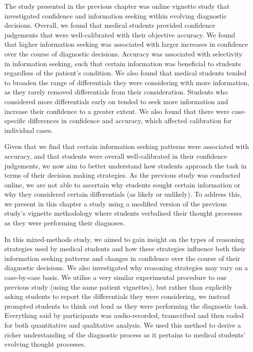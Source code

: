 \documentclass[a4paper, nobind]{templates/ociamthesis}
\begin{document}
The study presented in the previous chapter was online vignette study that investigated confidence and information seeking within evolving diagnostic decisions. Overall, we found that medical students provided confidence judgements that were well-calibrated with their objective accuracy. We found that higher information seeking was associated with larger increases in confidence over the course of diagnostic decisions. Accuracy was associated with selectivity in information seeking, such that certain information was beneficial to students regardless of the patient's condition. We also found that medical students tended to broaden the range of differentials they were considering with more information, as they rarely removed differentials from their consideration. Students who considered more differentials early on tended to seek more information and increase their confidence to a greater extent. We also found that there were case-specific differences in confidence and accuracy, which affected calibration for individual cases.

\hfill\break
Given that we find that certain information seeking patterns were associated with accuracy, and that students were overall well-calibrated in their confidence judgements, we now aim to better understand how students approach the task in terms of their decision making strategies. As the previous study was conducted online, we are not able to ascertain why students sought certain information or why they considered certain differentials (as likely or unlikely). To address this, we present in this chapter a study using a modified version of the previous study's vignette methodology where students verbalised their thought processes as they were performing their diagnoses.

\hfill\break
In this mixed-methods study, we aimed to gain insight on the types of reasoning strategies used by medical students and how these strategies influence both their information seeking patterns and changes in confidence over the course of their diagnostic decisions. We also investigated why reasoning strategies may vary on a case-by-case basis. We utilise a very similar experimental procedure to our previous study (using the same patient vignettes), but rather than explicitly asking students to report the differentials they were considering, we instead prompted students to think out loud as they were performing the diagnostic task. Everything said by participants was audio-recorded, transcribed and then coded for both quantitative and qualitative analysis. We used this method to derive a richer understanding of the diagnostic process as it pertains to medical students' evolving thought processes.
\end{document}
